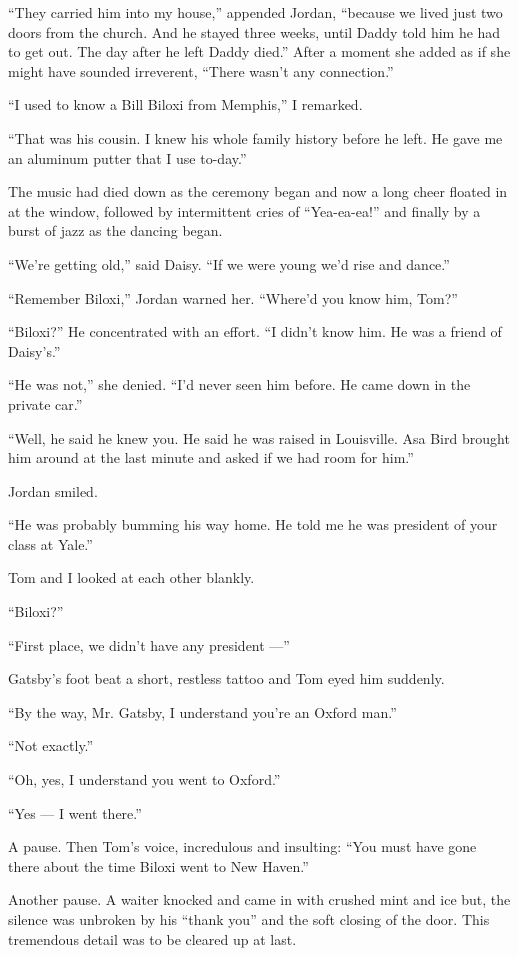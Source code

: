 \documentclass{znotebook}
\begin{document}
``They carried him into my house,'' appended Jordan, ``because we lived just two doors from the church. And he stayed three weeks, until Daddy told him he had to get out. The day after he left Daddy died.'' After a moment she added as if she might have sounded irreverent, ``There wasn't any connection.''

``I used to know a Bill Biloxi from Memphis,'' I remarked.

``That was his cousin. I knew his whole family history before he left. He gave me an aluminum putter that I use to-day.''

The music had died down as the ceremony began and now a long cheer floated in at the window, followed by intermittent cries of ``Yea-ea-ea!'' and finally by a burst of jazz as the dancing began.

``We're getting old,'' said Daisy. ``If we were young we'd rise and dance.''

``Remember Biloxi,'' Jordan warned her. ``Where'd you know him, Tom?''

``Biloxi?'' He concentrated with an effort. ``I didn't know him. He was a friend of Daisy's.''

``He was not,'' she denied. ``I'd never seen him before. He came down in the private car.''

``Well, he said he knew you. He said he was raised in Louisville. Asa Bird brought him around at the last minute and asked if we had room for him.''

Jordan smiled.

``He was probably bumming his way home. He told me he was president of your class at Yale.''

Tom and I looked at each other blankly.

``Biloxi?''

``First place, we didn't have any president ---''

Gatsby's foot beat a short, restless tattoo and Tom eyed him suddenly.

``By the way, Mr. Gatsby, I understand you're an Oxford man.''

``Not exactly.''

``Oh, yes, I understand you went to Oxford.''

``Yes ---{} I went there.''

A pause. Then Tom's voice, incredulous and insulting: ``You must have gone there about the time Biloxi went to New Haven.''

Another pause. A waiter knocked and came in with crushed mint and ice but, the silence was unbroken by his ``thank you'' and the soft closing of the door. This tremendous detail was to be cleared up at last.
\end{document}
